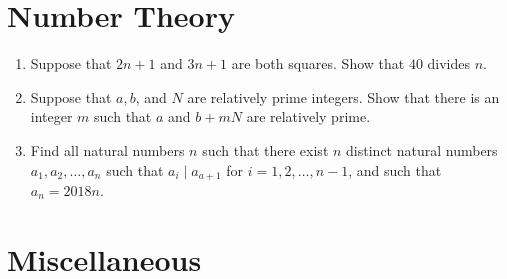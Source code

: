 \documentclass{article}
\begin{document}
\section*{Number Theory}

\begin{enumerate}[1.]

\item %
Suppose that $2n + 1$ and $3n + 1$ are both squares. Show that $40$ divides $n$.



\item %
Suppose that $a, b$, and $N$ are relatively prime integers. Show that there is an integer $m$ such that $a$ and $b + mN$ are relatively prime.


\item %
Find all natural numbers $n$ such that there exist $n$ distinct natural numbers $a_1, a_2, \dots, a_n$ such that $a_{i} \mid a_{a + 1}$ for $i = 1, 2, \dots, n-1$, and such that $a_n = 2018 n$.


\end{enumerate}

\section*{Miscellaneous}
\end{document}
